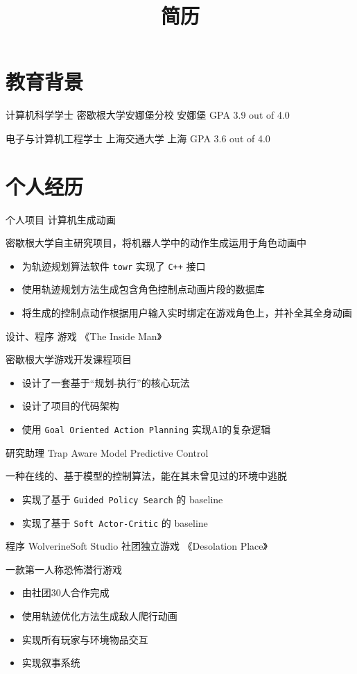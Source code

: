 \documentclass[10pt, a4paper, sans]{moderncv}
\title{简历}
\begin{document}
\makecvtitle

\section{教育背景}
{计算机科学学士}
{密歇根大学安娜堡分校}
{安娜堡}
{GPA 3.9 out of 4.0}
{}

{电子与计算机工程学士}
{上海交通大学}
{上海}
{GPA 3.6 out of 4.0}
{}

\section{个人经历}
{个人项目}
{计算机生成动画}
{}{}
{密歇根大学自主研究项目，将机器人学中的动作生成运用于角色动画中
	\begin{itemize}
		\item 为轨迹规划算法软件 \texttt{towr} 实现了 \texttt{C++} 接口
		\item 使用轨迹规划方法生成包含角色控制点动画片段的数据库
		\item 将生成的控制点动作根据用户输入实时绑定在游戏角色上，并补全其全身动画
	\end{itemize}
}

{设计、程序}
{游戏 《The Inside Man》}
{}{}
{密歇根大学游戏开发课程项目
	\begin{itemize}
		\item 设计了一套基于“规划-执行”的核心玩法
		\item 设计了项目的代码架构
		\item 使用 \texttt{Goal Oriented Action Planning} 实现AI的复杂逻辑
	\end{itemize}
}

{研究助理}
{Trap Aware Model Predictive Control}
{}{}
{一种在线的、基于模型的控制算法，能在其未曾见过的环境中逃脱
	\begin{itemize}
		\item 实现了基于 \texttt{Guided Policy Search} 的 baseline
		\item 实现了基于 \texttt{Soft Actor-Critic} 的 baseline
	\end{itemize}
}

{程序}
{WolverineSoft Studio 社团独立游戏 《Desolation Place》}
{}{}
{一款第一人称恐怖潜行游戏
	\begin{itemize}
		\item 由社团30人合作完成
		\item 使用轨迹优化方法生成敌人爬行动画
		\item 实现所有玩家与环境物品交互
		\item 实现叙事系统
	\end{itemize}
}
\end{document}
